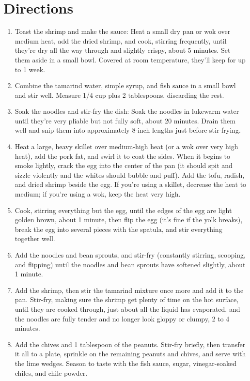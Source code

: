 \documentclass[11pt,letterpaper]{article}
\begin{document}
\section*{Directions}
\begin{enumerate}
    \item Toast the shrimp and make the sauce: Heat a small dry pan or wok over medium heat, add the dried shrimp, and cook, stirring frequently, until they’re dry all the way through and slightly crispy, about 5 minutes. Set them aside in a small bowl. Covered at room temperature, they’ll keep for up to 1 week.
    \item Combine the tamarind water, simple syrup, and fish sauce in a small bowl and stir well. Measure 1/4 cup plus 2 tablespoons, discarding the rest.
    \item Soak the noodles and stir-fry the dish: Soak the noodles in lukewarm water until they’re very pliable but not fully soft, about 20 minutes. Drain them well and snip them into approximately 8-inch lengths just before stir-frying.
    \item Heat a large, heavy skillet over medium-high heat (or a wok over very high heat), add the pork fat, and swirl it to coat the sides. When it begins to smoke lightly, crack the egg into the center of the pan (it should spit and sizzle violently and the whites should bubble and puff). Add the tofu, radish, and dried shrimp beside the egg. If you’re using a skillet, decrease the heat to medium; if you’re using a wok, keep the heat very high.
    \item Cook, stirring everything but the egg, until the edges of the egg are light golden brown, about 1 minute, then flip the egg (it’s fine if the yolk breaks), break the egg into several pieces with the spatula, and stir everything together well.
    \item Add the noodles and bean sprouts, and stir-fry (constantly stirring, scooping, and flipping) until the noodles and bean sprouts have softened slightly, about 1 minute.
    \item Add the shrimp, then stir the tamarind mixture once more and add it to the pan. Stir-fry, making sure the shrimp get plenty of time on the hot surface, until they are cooked through, just about all the liquid has evaporated, and the noodles are fully tender and no longer look gloppy or clumpy, 2 to 4 minutes.
    \item Add the chives and 1 tablespoon of the peanuts. Stir-fry briefly, then transfer it all to a plate, sprinkle on the remaining peanuts and chives, and serve with the lime wedges. Season to taste with the fish sauce, sugar, vinegar-soaked chiles, and chile powder.
\end{enumerate}
\end{document}
